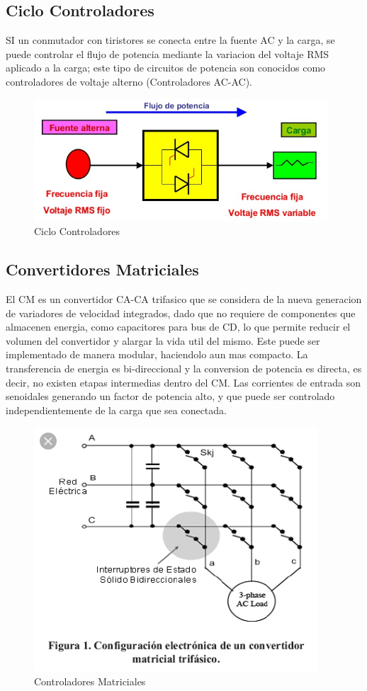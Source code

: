 \documentclass[11pt]{article}
\begin{document}
\pagebreak
\subsection{Ciclo Controladores}
SI un conmutador con tiristores se conecta entre la fuente AC y la carga, se puede controlar el flujo de potencia mediante la variacion del voltaje RMS aplicado a la carga; este tipo de circuitos de potencia son conocidos como controladores de voltaje alterno (Controladores AC-AC).
\begin{figure}[htp]
\centering
\includegraphics[scale=0.60]{Ciclo controladores.png}
\caption{Ciclo Controladores}
\label{}
\end{figure}
\subsection{Convertidores Matriciales}
El CM es un convertidor CA-CA trifasico que se considera de la nueva generacion de variadores de velocidad integrados, dado que no requiere de componentes que almacenen energia, como capacitores para bus de CD, lo que permite reducir el volumen del convertidor y alargar la vida util del mismo. Este puede ser implementado de manera modular, haciendolo aun mas compacto. La transferencia de energia es bi-direccional y la conversion de potencia es directa, es decir, no existen etapas intermedias dentro del CM. Las corrientes de entrada son senoidales generando un factor de potencia alto, y que puede ser controlado independientemente de la carga que sea conectada.
\begin{figure}[htp]
\centering
\includegraphics[scale=0.30]{Controladores Matriciales.png}
\caption{Controladores Matriciales}
\label{}
\end{figure}
\end{document}
